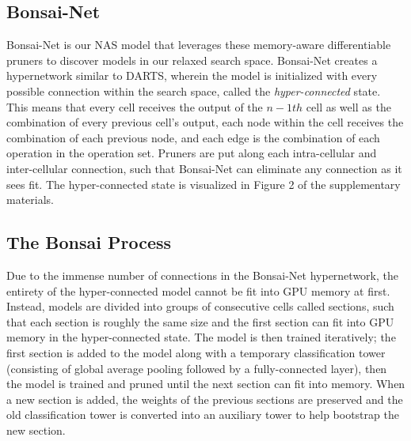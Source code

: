 \documentclass[10pt,twocolumn,letterpaper]{article}
\begin{document}
\subsection{Bonsai-Net}
Bonsai-Net is our NAS model that leverages these memory-aware differentiable pruners to discover models in our relaxed search space. Bonsai-Net creates a hypernetwork similar to DARTS, wherein the model is initialized with every possible connection within the search space, called the \textit{hyper-connected} state. This means that every cell receives the output of the $n-1th$ cell as well as the combination of every previous cell's output, each node within the cell receives the combination of each previous node, and each edge is the combination of each operation in the operation set. Pruners are put along each intra-cellular and inter-cellular connection, such that Bonsai-Net can eliminate any connection as it sees fit. The hyper-connected state is visualized in Figure 2 of the supplementary materials.

\subsection{The Bonsai Process}
Due to the immense number of connections in the Bonsai-Net hypernetwork, the entirety of the hyper-connected model cannot be fit into GPU memory at first. Instead, models are divided into groups of consecutive cells called sections, such that each section is roughly the same size and the first section can fit into GPU memory in the hyper-connected state. The model is then trained iteratively; the first section is added to the model along with a temporary classification tower (consisting of global average pooling followed by a fully-connected layer), then the model is trained and pruned until the next section can fit into memory. When a new section is added, the weights of the previous sections are preserved and the old classification tower is converted into an auxiliary tower to help bootstrap the new section.
\end{document}
